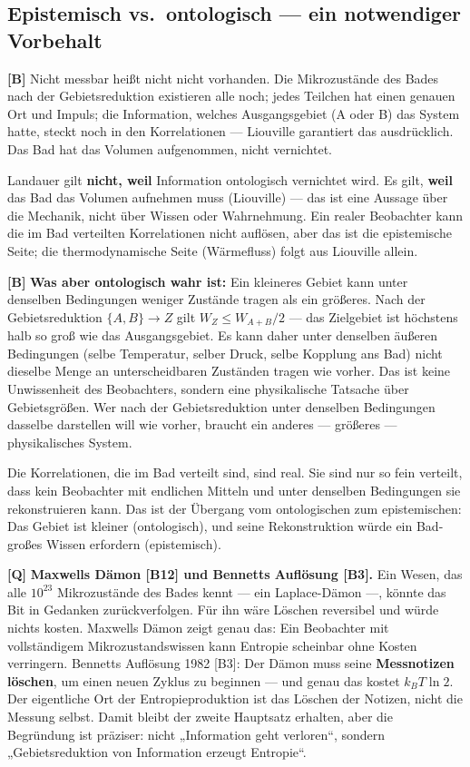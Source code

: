 \subsection{Epistemisch vs.\ ontologisch --- ein notwendiger Vorbehalt}

\textbf{[B]} Nicht messbar heißt nicht nicht vorhanden. Die Mikrozustände des Bades nach
der Gebietsreduktion existieren alle noch; jedes Teilchen hat einen genauen Ort
und Impuls; die Information, welches Ausgangsgebiet (A oder B) das System hatte,
steckt noch in den Korrelationen --- Liouville garantiert das ausdrücklich. Das
Bad hat das Volumen aufgenommen, nicht vernichtet.

Landauer gilt \textbf{nicht, weil} Information ontologisch vernichtet wird. Es
gilt, \textbf{weil} das Bad das Volumen aufnehmen muss (Liouville) --- das ist
eine Aussage über die Mechanik, nicht über Wissen oder Wahrnehmung. Ein realer
Beobachter kann die im Bad verteilten Korrelationen nicht auflösen, aber das ist
die epistemische Seite; die thermodynamische Seite (Wärmefluss) folgt aus
Liouville allein.

\textbf{[B]} \textbf{Was aber ontologisch wahr ist:} Ein kleineres Gebiet kann unter
denselben Bedingungen weniger Zustände tragen als ein größeres. Nach der
Gebietsreduktion $\{A,B\} \to Z$ gilt $W_Z \le W_{A+B}/2$ --- das Zielgebiet ist
höchstens halb so groß wie das Ausgangsgebiet. Es kann daher unter denselben
äußeren Bedingungen (selbe Temperatur, selber Druck, selbe Kopplung ans Bad) nicht
dieselbe Menge an unterscheidbaren Zuständen tragen wie vorher. Das ist keine
Unwissenheit des Beobachters, sondern eine physikalische Tatsache über
Gebietsgrößen. Wer nach der Gebietsreduktion unter denselben Bedingungen dasselbe
darstellen will wie vorher, braucht ein anderes --- größeres --- physikalisches
System.

Die Korrelationen, die im Bad verteilt sind, sind real. Sie sind nur so fein
verteilt, dass kein Beobachter mit endlichen Mitteln und unter denselben
Bedingungen sie rekonstruieren kann. Das ist der Übergang vom ontologischen zum
epistemischen: Das Gebiet ist kleiner (ontologisch), und seine Rekonstruktion
würde ein Bad-großes Wissen erfordern (epistemisch).

\textbf{[Q]} \textbf{Maxwells Dämon [B12] und Bennetts Auflösung [B3].} Ein Wesen, das alle
$10^{23}$ Mikrozustände des Bades kennt --- ein Laplace-Dämon ---, könnte das Bit
in Gedanken zurückverfolgen. Für ihn wäre Löschen reversibel und würde nichts
kosten. Maxwells Dämon zeigt genau das: Ein Beobachter mit vollständigem
Mikrozustandswissen kann Entropie scheinbar ohne Kosten verringern. Bennetts
Auflösung 1982 [B3]: Der Dämon muss seine \textbf{Messnotizen löschen}, um einen
neuen Zyklus zu beginnen --- und genau das kostet $k_B T \ln 2$. Der eigentliche
Ort der Entropieproduktion ist das Löschen der Notizen, nicht die Messung selbst.
Damit bleibt der zweite Hauptsatz erhalten, aber die Begründung ist präziser:
nicht „Information geht verloren“, sondern „Gebietsreduktion von Information
erzeugt Entropie“.

